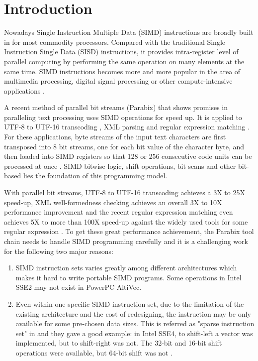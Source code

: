 %
%

\chapter{Introduction}
\label{one}

Nowadays Single Instruction Multiple Data (SIMD) instructions are broadly built in for most commodity processors. Compared with the traditional Single Instruction Single Data (SISD) instructions, it provides intra-register level of parallel computing by performing the same operation on many elements at the same time. SIMD instructions becomes more and more popular in the area of multimedia processing, digital signal processing or other compute-intensive applications \cite{hua_idisa}.

A recent method of parallel bit streams (Parabix) that shows promises in paralleling text processing uses SIMD operations for speed up. It is applied to UTF-8 to UTF-16 transcoding \cite{rob_u8u16, rob_u8u16_techreport}, XML parsing \cite{medforth_icxml, rob_xml} and regular expression matching \cite{rob_regex}. For these applications, byte streams of the input text characters are first transposed into 8 bit streams, one for each bit value of the character byte, and then loaded into SIMD registers so that 128 or 256 consecutive code units can be processed at once \cite{inductive_doubling_principle}. SIMD bitwise logic, shift operations, bit scans and other bit-based lies the foundation of this programming model.

With parallel bit streams, UTF-8 to UTF-16 transcoding achieves a 3X to 25X speed-up, XML well-formedness checking achieves an overall 3X to 10X performance improvement \cite{inductive_doubling_principle} and the recent regular expression matching even achieves 5X to more than 100X speed-up against the widely used tools for some regular expression \cite{rob_regex}. To get these great performance achievement, the Parabix tool chain needs to handle SIMD programming carefully and it is a challenging work for the following two major reasons:

\begin{enumerate}
  \item SIMD instruction sets varies greatly among different architectures which makes it hard to write portable SIMD programs. Some operations in Intel SSE2 may not exist in PowerPC AltiVec.
  \item Even within one specific SIMD instruction set, due to the limitation of the existing architecture and the cost of redesigning, the instruction may be only available for some pre-chosen data sizes. This is referred as "sparse instruction set" in \cite{hybrid_simd_type_legalize} and they gave a good example: in Intel SSE4, to shift-left a vector was implemented, but to shift-right was not. The 32-bit and 16-bit shift operations were available, but 64-bit shift was not \cite{hybrid_simd_type_legalize}.
\end{enumerate}

